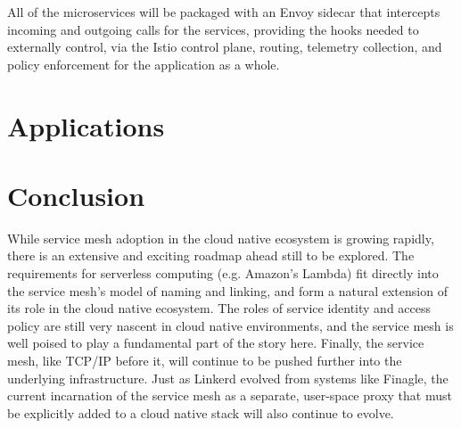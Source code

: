 \documentclass[conference]{IEEEtran}
\begin{document}
All of the microservices will be packaged with an Envoy sidecar that intercepts incoming and outgoing calls for the services, providing the hooks needed to externally control, via the Istio control plane, routing, telemetry collection, and policy enforcement for the application as a whole.\cite{bookinfo}


\section{Applications} \label{sec:app}

\section{Conclusion}
While service mesh adoption in the cloud native ecosystem is growing rapidly, there is an extensive and exciting roadmap ahead still to be explored. The requirements for serverless computing (e.g. Amazon’s Lambda) fit directly into the service mesh’s model of naming and linking, and form a natural extension of its role in the cloud native ecosystem. The roles of service identity and access policy are still very nascent in cloud native environments, and the service mesh is well poised to play a fundamental part of the story here. Finally, the service mesh, like TCP/IP before it, will continue to be pushed further into the underlying infrastructure. Just as Linkerd evolved from systems like Finagle, the current incarnation of the service mesh as a separate, user-space proxy that must be explicitly added to a cloud native stack will also continue to evolve.



\end{document}
